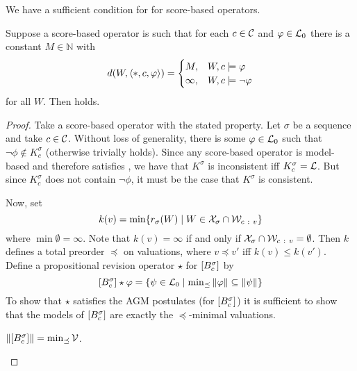 We have a sufficient condition for \agm{} for score-based operators.

\begin{lemma}
    \label{kr_lemma_score_based_agm_sufficient_conditions}
    Suppose a score-based operator is such that for each $c \in \mathcal{C}$ and $\varphi
    \in \mathcal{L}{}_0$ there is a constant $M \in \mathbb{N}$ with
    \[
        d(W, \langle {\ast, c,  \varphi} \rangle)
        = \begin{cases}
            M,& W, c \models \varphi  \\
            \infty,& W, c \models \neg \varphi
        \end{cases}
    \]
    for all $W$. Then \agm{} holds.
\end{lemma}

\begin{proof}
    Take a score-based operator with the stated property. Let $\sigma$ be a
    sequence and take $c \in \mathcal{C}$. Without loss of generality, there is some
    $\varphi \in \mathcal{L}{}_0$ such that $\neg\phi \notin K^\sigma_c$ (otherwise \agm{}
    trivially holds). Since any score-based operator is model-based and
    therefore satisfies \closure{}, we have that $K^\sigma$ is inconsistent iff
    $K^\sigma_c = \mathcal{L}{}$. But since $K^\sigma_c$ does not contain $\neg\phi$,
    it must be the case that $K^\sigma$ is consistent.

    Now, set
    \[
        k(v)
        = \min\{
            r_\sigma(W)
            \mid
            W \in \mathcal{X}_\sigma \cap \mathcal{W}_{c\ :\ v}
        \}
    \]
    where $\min\emptyset =  \infty$. Note that $k(v) = \infty$ if and only if
    $\mathcal{X}_\sigma \cap \mathcal{W}_{c\ :\  v} = \emptyset$. Then $k$ defines a total
    preorder $\preceq$ on valuations, where $v \preceq v'$ iff $k(v) \le
    k(v')$. Define a propositional revision operator $\star$ for
    $\left[{B^\sigma_c}\right]$ by
    \[
        \left[{B^\sigma_c}\right] \star \varphi = \{
            \psi \in \mathcal{L}{}_0
            \mid
            \min\nolimits_{\preceq}{\|{\varphi}\|} \subseteq \|{\psi}\|
        \}
    \]
    To show that $\star$ satisfies the AGM postulates (for
    $\left[{B^\sigma_c}\right]$) it is sufficient to show that the models of
    $\left[{B^\sigma_c}\right]$ are exactly the $\preceq$-minimal valuations.

        \begin{claim}
            $\|{\left[{B^\sigma_c}\right]}\| = \min_{\preceq}{\mathcal{V}}$.
        \end{claim}
        \begin{claimproof}


\end{claimproof}
\end{proof}
